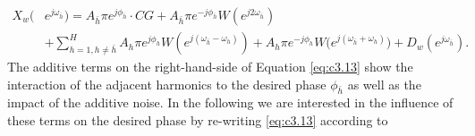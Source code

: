 \begin{equation}\label{eq:c3.13}
\begin{split}
X_w(&e^{j\omega_{\bar{h}}})=A_{\bar{h}}\pi e^{j{\phi}_{\bar{h}}}\cdot CG+A_{\bar{h}}\pi e^{-j{\phi}_{\bar{h}}}W(e^{j2\omega_{\bar{h}}})\\
&+\sum_{h=1,h\neq{\bar{h}}}^H {A_h\pi e^{j{\phi}_h}W(e^{j(\omega_{\bar{h}}-\omega_h)})+A_h\pi e^{-j{\phi}_h}W(e^{j(\omega_{\bar{h}}+\omega_h)}})+D_w(e^{j\omega_{\bar{h}}}).
\end{split}
\end{equation}
The additive terms on the right-hand-side of Equation \eqref{eq:c3.13} show the interaction of the adjacent harmonics to the desired phase $\phi_{\bar{h}}$ as well as the impact of the additive noise. In the following we are interested in the influence of these terms on the desired phase by re-writing \eqref{eq:c3.13} according to

